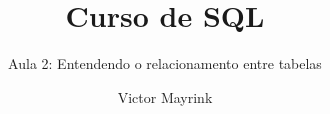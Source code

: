 \documentclass[t, 10pt, aspectratio=169, table, x11names]{beamer}
\begin{document}
	\author{Victor Mayrink}
	\title{Curso de SQL}
	\subtitle{Aula 2: Entendendo o relacionamento entre tabelas}

	\begin{frame}[plain]
		\maketitle
	\end{frame}
		
\end{document}
